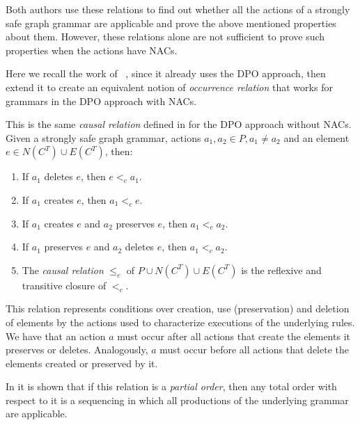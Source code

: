 Both authors use these relations to find out whether all the actions of a strongly safe graph grammar are applicable and prove the above mentioned properties about them. However, these relations alone are not sufficient to prove such properties when the actions have NACs.

Here we recall the work of ~\cite{Corradini1996}, since it already uses the DPO approach, then extend it to create an equivalent notion of \emph{occurrence relation} that works for grammars in the DPO approach with NACs.

\begin{definition}\label{def:causal-relation} This is the same \emph{causal relation} defined in \cite{Corradini1996} for the DPO approach without NACs. Given  \doublyTypedGraphGrammarCore{} a strongly safe graph grammar, actions \mbox{$a_1, a_2 \in P, a_1 \ne a_2$} and an element \mbox{$e \in N(C^T) \cup E(C^T)$}, then:

  \begin{enumerate}
    \item If $a_1$ deletes $e$, then $e <_c a_1$.
    \item If $a_1$ creates $e$, then $a_1 <_c e$.
    \item If $a_1$ creates $e$ and $a_2$ preserves $e$, then $a_1 <_c a_2$.
    \item If $a_1$ preserves $e$ and $a_2$ deletes $e$, then $a_1 <_c a_2$. 
    \item The \emph{causal relation} $\leq_c$ of $P \cup N(C^T) \cup E(C^T)$ is the reflexive and transitive closure of $<_c$.
  \end{enumerate}\end{definition}

This relation represents conditions over creation, use (preservation) and deletion of elements by the actions used to characterize executions of the underlying rules. We have that an action $a$ must occur after all actions that create the elements it preserves or deletes. Analogously, $a$ must occur before all actions that delete the elements created or preserved by it.

In \cite{Corradini1996} it is shown that if this relation is a \emph{partial order}, then any total order with respect to it is a sequencing in which all productions of the underlying grammar are applicable.

